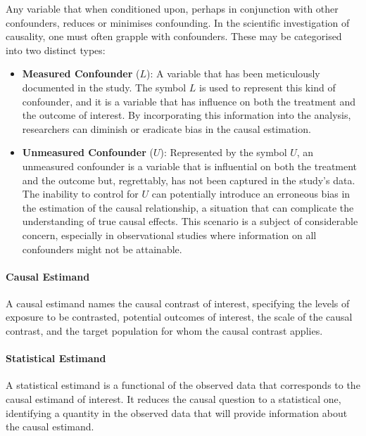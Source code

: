 \documentclass[
  singlecolumn]{article}
\let\oldparagraph\paragraph
\renewcommand{\paragraph}[1]{\oldparagraph{#1}\mbox{}}
\begin{document}
Any variable that when conditioned upon, perhaps in conjunction with
other confounders, reduces or minimises confounding. In the scientific
investigation of causality, one must often grapple with confounders.
These may be categorised into two distinct types:

\begin{itemize}
\item
  \textbf{Measured Confounder} (\(L\)): A variable that has been
  meticulously documented in the study. The symbol \(L\) is used to
  represent this kind of confounder, and it is a variable that has
  influence on both the treatment and the outcome of interest. By
  incorporating this information into the analysis, researchers can
  diminish or eradicate bias in the causal estimation.
\item
  \textbf{Unmeasured Confounder} (\(U\)): Represented by the symbol
  \(U\), an unmeasured confounder is a variable that is influential on
  both the treatment and the outcome but, regrettably, has not been
  captured in the study's data. The inability to control for \(U\) can
  potentially introduce an erroneous bias in the estimation of the
  causal relationship, a situation that can complicate the understanding
  of true causal effects. This scenario is a subject of considerable
  concern, especially in observational studies where information on all
  confounders might not be attainable.
\end{itemize}

\paragraph{\texorpdfstring{\textbf{Causal
Estimand}}{Causal Estimand}}\label{causal-estimand}

A causal estimand names the causal contrast of interest, specifying the
levels of exposure to be contrasted, potential outcomes of interest, the
scale of the causal contrast, and the target population for whom the
causal contrast applies.

\paragraph{\texorpdfstring{\textbf{Statistical
Estimand}}{Statistical Estimand}}\label{statistical-estimand}

A statistical estimand is a functional of the observed data that
corresponds to the causal estimand of interest. It reduces the causal
question to a statistical one, identifying a quantity in the observed
data that will provide information about the causal estimand.
\end{document}
